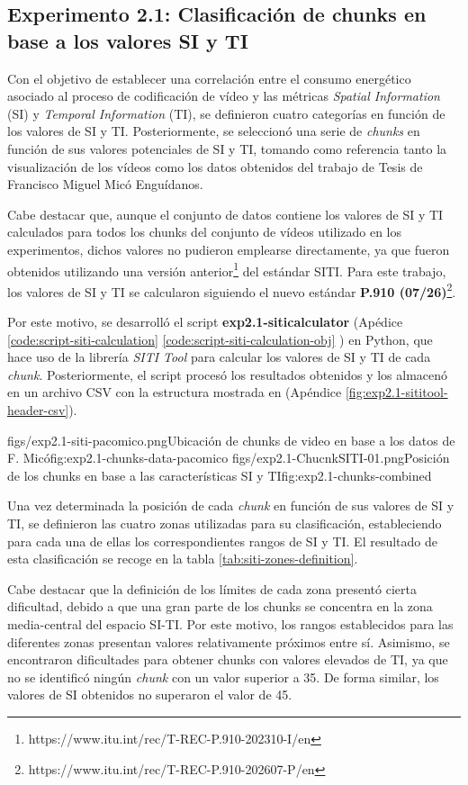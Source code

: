 \subsection{Experimento 2.1: Clasificación de chunks en base a los valores SI y TI}

Con el objetivo de establecer una correlación entre el consumo energético asociado al proceso de codificación de vídeo y las métricas \textit{Spatial Information} (SI) y \textit{Temporal Information} (TI), se definieron cuatro categorías en función de los valores de SI y TI. Posteriormente, se seleccionó una serie de \textit{chunks} en función de sus valores potenciales de SI y TI, tomando como referencia tanto la visualización de los vídeos como los datos obtenidos del trabajo de Tesis de Francisco Miguel Micó Enguídanos.

Cabe destacar que, aunque el conjunto de datos contiene los valores de SI y TI calculados para todos los chunks del conjunto de vídeos utilizado en los experimentos, dichos valores no pudieron emplearse directamente, ya que fueron obtenidos utilizando una versión anterior\footnote{https://www.itu.int/rec/T-REC-P.910-202310-I/en} del estándar SITI. Para este trabajo, los valores de SI y TI se calcularon siguiendo el nuevo estándar \textbf{P.910 (07/26)}\footnote{https://www.itu.int/rec/T-REC-P.910-202607-P/en}.

Por este motivo, se desarrolló el script \textbf{exp2.1-siticalculator} (Apédice \ref{code:script-siti-calculation} \ref{code:script-siti-calculation-obj} ) en Python, que hace uso de la librería \textit{SITI Tool} \cite{siti-tool-pypip} para calcular los valores de SI y TI de cada \textit{chunk}. Posteriormente, el script procesó los resultados obtenidos y los almacenó en un archivo CSV con la estructura mostrada en (Apéndice \ref{fig:exp2.1-sititool-header-csv}).

\dosubfigs
     {figs/exp2.1-siti-pacomico.png}{Ubicación de chunks de video en base a los datos de F. Micó}{fig:exp2.1-chunks-data-pacomico}
     {figs/exp2.1-ChucnkSITI-01.png}{Posición de los chunks en base a las características SI y TI}{fig:exp2.1-chunks-combined}

Una vez determinada la posición de cada \textit{chunk} en función de sus valores de SI y TI, se definieron las cuatro zonas utilizadas para su clasificación, estableciendo para cada una de ellas los correspondientes rangos de SI y TI. El resultado de esta clasificación se recoge en la tabla \ref{tab:siti-zones-definition}.

Cabe destacar que la definición de los límites de cada zona presentó cierta dificultad, debido a que una gran parte de los chunks se concentra en la zona media-central del espacio SI-TI. Por este motivo, los rangos establecidos para las diferentes zonas presentan valores relativamente próximos entre sí. Asimismo, se encontraron dificultades para obtener chunks con valores elevados de TI, ya que no se identificó ningún \textit{chunk} con un valor superior a 35. De forma similar, los valores de SI obtenidos no superaron el valor de 45.

